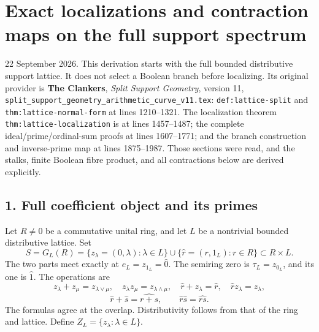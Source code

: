\section{Exact localizations and contraction maps on the full support
spectrum}\label{exact-localizations-and-contraction-maps-on-the-full-support-spectrum}

22 September 2026. This derivation starts with the full bounded
distributive support lattice. It does not select a Boolean branch before
localizing. Its original provider is \textbf{The Clankers}, \emph{Split
Support Geometry}, version 11,
\nolinkurl{split_support_geometry_arithmetic_curve_v11.tex}:
\nolinkurl{def:lattice-split} and \nolinkurl{thm:lattice-normal-form} at lines
1210--1321.
The localization theorem \nolinkurl{thm:lattice-localization} is at lines 1457--1487; the
complete ideal/prime/ordinal-sum proofs at lines 1607--1771; and the
branch construction and inverse-prime map at lines 1875--1987. Those
sections were read, and the stalks, finite Boolean fibre product, and
all contractions below are derived explicitly.

\subsection{1. Full coefficient object and its
primes}\label{full-coefficient-object-and-its-primes}

Let \(R\ne0\) be a commutative unital ring, and let \(L\) be a
nontrivial bounded distributive lattice. Set \[
 S=G_L(R)=\{z_\lambda=(0,\lambda):\lambda\in L\}
 \cup\{\widehat r=(r,1_L):r\in R\}\subset R\times L.
 \tag{TL1}
\] The two parts meet exactly at \(e_L=z_{1_L}=\widehat0\). The semiring
zero is \(\tau_L=z_{0_L}\), and its one is \(\widehat1\). The operations
are \[
 z_\lambda+z_\mu=z_{\lambda\vee\mu},\quad
 z_\lambda z_\mu=z_{\lambda\wedge\mu},\quad
 \widehat r+z_\lambda=\widehat r,\quad
 \widehat r z_\lambda=z_\lambda,
\] \[
 \widehat r+\widehat s=\widehat{r+s},\qquad
 \widehat r\widehat s=\widehat{rs}.
 \tag{TL2}
\] The formulas agree at the overlap. Distributivity follows from that
of the ring and lattice. Define \(Z_L=\{z_\lambda:\lambda\in L\}\).

